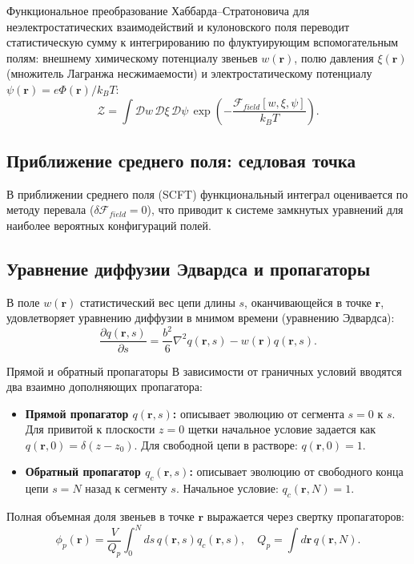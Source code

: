 \documentclass[12pt,a4paper]{article}
\begin{document}
Функциональное преобразование Хаббарда--Стратоновича для неэлектростатических взаимодействий и кулоновского поля переводит статистическую сумму к интегрированию по флуктуирующим вспомогательным полям: внешнему химическому потенциалу звеньев $w(\mathbf{r})$, полю давления $\xi(\mathbf{r})$ (множитель Лагранжа несжимаемости) и электростатическому потенциалу $\psi(\mathbf{r}) = e\Phi(\mathbf{r})/k_B T$:
\begin{equation}
\mathcal{Z} = \int \mathcal{D}w \, \mathcal{D}\xi \, \mathcal{D}\psi \, \exp\left( -\frac{\mathcal{F}_{field}[w, \xi, \psi]}{k_B T} \right).
\end{equation}

\subsection{Приближение среднего поля: седловая точка}
В приближении среднего поля (SCFT) функциональный интеграл оценивается по методу перевала ($\delta \mathcal{F}_{field} = 0$), что приводит к системе замкнутых уравнений для наиболее вероятных конфигураций полей.

\subsection{Уравнение диффузии Эдвардса и пропагаторы}
В поле $w(\mathbf{r})$ статистический вес цепи длины $s$, оканчивающейся в точке $\mathbf{r}$, удовлетворяет уравнению диффузии в мнимом времени (уравнению Эдвардса):
\begin{equation}
\frac{\partial q(\mathbf{r}, s)}{\partial s} = \frac{b^2}{6}\nabla^2 q(\mathbf{r}, s) - w(\mathbf{r}) q(\mathbf{r}, s).
\label{eq:edwards}
\end{equation}

\begin{theorybox}{Прямой и обратный пропагаторы}
В зависимости от граничных условий вводятся два взаимно дополняющих пропагатора:
\begin{itemize}
    \item \textbf{Прямой пропагатор $q(\mathbf{r}, s)$:} описывает эволюцию от сегмента $s=0$ к $s$. Для привитой к плоскости $z=0$ щетки начальное условие задается как $q(\mathbf{r}, 0) = \delta(z - z_0)$. Для свободной цепи в растворе: $q(\mathbf{r}, 0) = 1$.
    \item \textbf{Обратный пропагатор $q_c(\mathbf{r}, s)$:} описывает эволюцию от свободного конца цепи $s=N$ назад к сегменту $s$. Начальное условие: $q_c(\mathbf{r}, N) = 1$.
\end{itemize}
Полная объемная доля звеньев в точке $\mathbf{r}$ выражается через свертку пропагаторов:
\begin{equation}
\phi_p(\mathbf{r}) = \frac{V}{Q_p} \int_0^N ds \, q(\mathbf{r}, s) q_c(\mathbf{r}, s), \quad Q_p = \int d\mathbf{r} \, q(\mathbf{r}, N).
\end{equation}
\end{theorybox}
\end{document}
